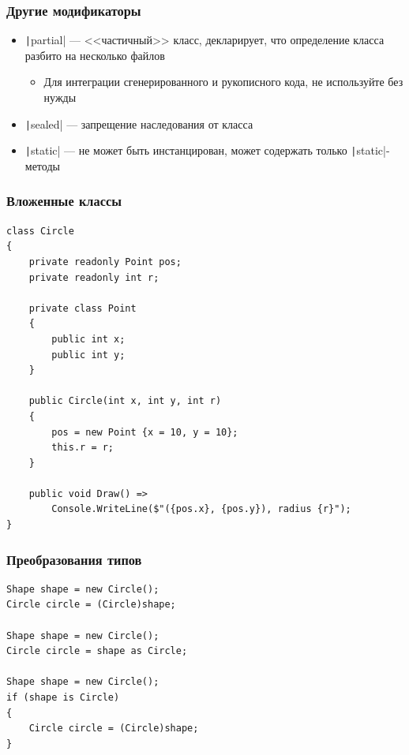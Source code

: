 \documentclass[xetex,mathserif,serif]{beamer}
\begin{document}
	\begin{frame}
		\frametitle{Другие модификаторы}
		\begin{itemize}
			\item \texttt|partial| --- <<частичный>> класс, декларирует, что определение класса разбито на несколько файлов
			\begin{itemize}
				\item Для интеграции сгенерированного и рукописного кода, не используйте без нужды
			\end{itemize}
			\item \texttt|sealed| --- запрещение наследования от класса
			\item \texttt|static| --- не может быть инстанцирован, может содержать только \texttt|static|-методы
		\end{itemize}
	\end{frame}

	\begin{frame}[fragile]
		\frametitle{Вложенные классы}
		\begin{scriptsize}
			\begin{verbatim}
class Circle
{
    private readonly Point pos;
    private readonly int r;

    private class Point
    {
        public int x;
        public int y;
    }

    public Circle(int x, int y, int r)
    {
        pos = new Point {x = 10, y = 10};
        this.r = r;
    }

    public void Draw() =>
        Console.WriteLine($"({pos.x}, {pos.y}), radius {r}");
}
			\end{verbatim}
		\end{scriptsize}
\end{frame}

	\begin{frame}[fragile]
		\frametitle{Преобразования типов}
		\begin{verbatim}
Shape shape = new Circle();
Circle circle = (Circle)shape;

Shape shape = new Circle();
Circle circle = shape as Circle;

Shape shape = new Circle();
if (shape is Circle)
{
    Circle circle = (Circle)shape;
}
		\end{verbatim}
\end{frame}
\end{document}

